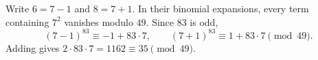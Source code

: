 Write $6=7-1$ and $8=7+1$. In their binomial expansions, every term containing $7^2$ vanishes modulo $49$. Since $83$ is odd,
\[
(7-1)^{83}\equiv-1+83\cdot7,\qquad
(7+1)^{83}\equiv1+83\cdot7\pmod{49}.
\]
Adding gives $2\cdot83\cdot7=1162\equiv\boxed{35}\pmod{49}$.
